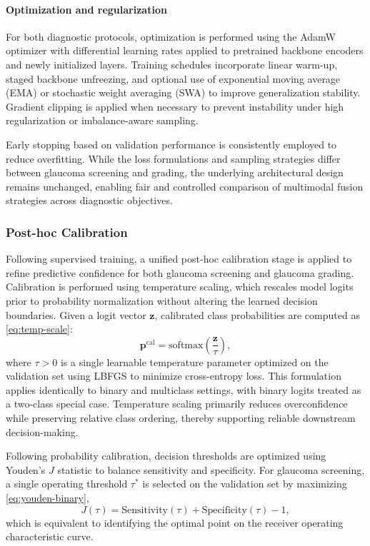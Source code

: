\documentclass[preprint,12pt]{elsarticle}
\newcommand{\eqrefp}[1]{\eqref{#1}}
\begin{document}
\paragraph{Optimization and regularization}
For both diagnostic protocols, optimization is performed using the AdamW optimizer with differential learning rates applied to pretrained backbone encoders and newly initialized layers. Training schedules incorporate linear warm-up, staged backbone unfreezing, and optional use of exponential moving average (EMA) or stochastic weight averaging (SWA) to improve generalization stability. Gradient clipping is applied when necessary to prevent instability under high regularization or imbalance-aware sampling.

Early stopping based on validation performance is consistently employed to reduce overfitting. While the loss formulations and sampling strategies differ between glaucoma screening and grading, the underlying architectural design remains unchanged, enabling fair and controlled comparison of multimodal fusion strategies across diagnostic objectives.


\subsubsection{Post-hoc Calibration}
\label{subsubsec:posthoc_calibration}

Following supervised training, a unified post-hoc calibration stage is applied to refine predictive confidence for both glaucoma screening and glaucoma grading. Calibration is performed using temperature scaling, which rescales model logits prior to probability normalization without altering the learned decision boundaries. Given a logit vector $\mathbf{z}$, calibrated class probabilities are computed as \eqrefp{eq:temp-scale}:
\begin{equation}
    \mathbf{p}^{\text{cal}} =
    \mathrm{softmax}\!\left(\frac{\mathbf{z}}{\tau}\right),
    \label{eq:temp-scale}
\end{equation}
where $\tau>0$ is a single learnable temperature parameter optimized on the validation set using LBFGS to minimize cross-entropy loss. This formulation applies identically to binary and multiclass settings, with binary logits treated as a two-class special case. Temperature scaling primarily reduces overconfidence while preserving relative class ordering, thereby supporting reliable downstream decision-making.

Following probability calibration, decision thresholds are optimized using Youden’s $J$ statistic to balance sensitivity and specificity. For glaucoma screening, a single operating threshold $\tau^{*}$ is selected on the validation set by maximizing \eqrefp{eq:youden-binary},
\begin{equation}
    J(\tau) = \mathrm{Sensitivity}(\tau) + \mathrm{Specificity}(\tau) - 1,
    \label{eq:youden-binary}
\end{equation}
which is equivalent to identifying the optimal point on the receiver operating characteristic curve.
\end{document}
